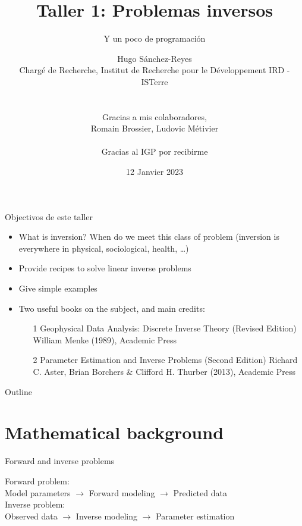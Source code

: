 \documentclass{beamer}
\title{{\normalsize \vskip 2cm 
Taller 1: Problemas inversos}}
\subtitle{\small Y un poco de programación}
\author{Hugo S\'anchez-Reyes \\ {\tiny Charg\'e de Recherche, Institut de Recherche pour le Développement IRD - ISTerre} \\ 
\\
\\
Gracias a mis colaboradores, \\
Romain Brossier, Ludovic Métivier \\
\\
Gracias al IGP por recibirme
}
\date[2021]{\vskip -0.5cm \hfill 12 Janvier 2023}
\begin{document}

\begin{frame}
    \titlepage
\end{frame}


\begin{frame} {Objectivos de este taller}

\begin{itemize}
 \item What is inversion? When do we meet this class of problem
(inversion is everywhere in physical, sociological, health, \dots )
 \item Provide recipes to solve linear inverse problems
 \item Give simple examples
 \item Two useful books on the subject, and main credits:
 \begin{itemize}
  \item[1] Geophysical Data Analysis: Discrete Inverse Theory (Revised Edition) William Menke (1989), Academic Press
  \item[2] Parameter Estimation and Inverse Problems (Second Edition) Richard C. Aster, Brian Borchers \& Clifford H. Thurber (2013), Academic Press
 \end{itemize}
\end{itemize}
 
\end{frame}

\begin{frame}
 {Outline}
 
 \tableofcontents

\end{frame}

\section{Mathematical background}

\begin{frame}
 {Forward and inverse problems}

Forward problem: \\
Model parameters $\rightarrow$ Forward modeling $\rightarrow$ Predicted data \\
Inverse problem: \\
Observed data $\rightarrow$ Inverse modeling $\rightarrow$ Parameter estimation

\end{frame}
\end{document}
